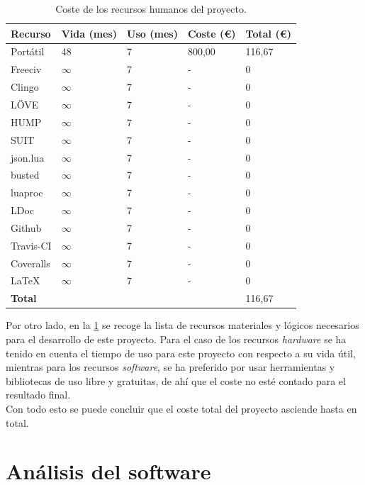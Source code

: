 \begin{table}[!h]
	\centering
	\begin{tabularx}{\textwidth}{ X X X X X }
		\bfseries{Recurso} & \bfseries{Vida (mes)} & \bfseries{Uso (mes)} & \bfseries{Coste (\euro)} & \bfseries{Total (\euro)} \\
		\hline
		Portátil & 48 & 7 & 800,00 & 116,67 \\
		Freeciv & $\infty$ & 7 & - & 0 \\
		Clingo & $\infty$ & 7 & - & 0 \\
		LÖVE & $\infty$ & 7 & - & 0 \\
		HUMP & $\infty$ & 7 & - & 0 \\
		SUIT & $\infty$ & 7 & - & 0 \\
		json.lua & $\infty$ & 7 & - & 0 \\
		busted & $\infty$ & 7 & - & 0 \\
		luaproc & $\infty$ & 7 & - & 0 \\
		LDoc & $\infty$ & 7 & - & 0 \\
		Github & $\infty$ & 7 & - & 0 \\
		Travis-CI & $\infty$ & 7 & - & 0 \\
		Coveralls & $\infty$ & 7 & - & 0 \\
		LaTeX & $\infty$ & 7 & - & 0 \\
		\hline
		\bfseries{Total} & & & & 116,67 \\
		\hline
	\end{tabularx}
	\caption{Coste de los recursos humanos del proyecto.}\label{table:costematerial}
\end{table}

Por otro lado, en la \ref{table:costematerial} se recoge la lista de recursos materiales y lógicos necesarios para el desarrollo de este proyecto. Para el caso de los recursos \textit{hardware} se ha tenido en cuenta el tiempo de uso para este proyecto con respecto a su vida útil, mientras para los recursos \textit{software}, se ha preferido por usar herramientas y bibliotecas de uso libre y gratuitas, de ahí que el coste no esté contado para el resultado final. \\

Con todo esto se puede concluir que el coste total del proyecto asciende hasta  en total.

\section{Análisis del software}

